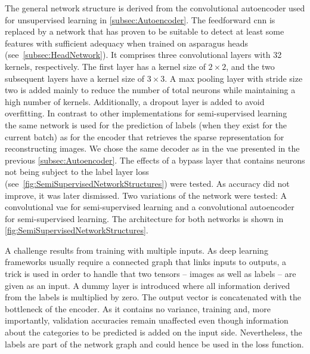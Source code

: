 \bigskip
The general network structure is derived from the convolutional autoencoder used for unsupervised learning in \autoref{subsec:Autoencoder}. The feedforward \acrshort{cnn} is replaced by a network that has proven to be suitable to detect at least some features with sufficient adequacy when trained on asparagus heads (see~\autoref{subsec:HeadNetwork}). It comprises three convolutional layers with 32 kernels, respectively. The first layer has a kernel size of $2\times2$, and the two subsequent layers have a kernel size of $3\times3$. A max pooling layer with stride size two is added mainly to reduce the number of total neurons while maintaining a high number of kernels. Additionally, a dropout layer is added to avoid overfitting. In contrast to other implementations for semi-supervised learning~\citep{keng2017semi} the same network is used for the prediction of labels (when they exist for the current batch) as for the encoder that retrieves the sparse representation for reconstructing images. We chose the same decoder as in the \acrlong{vae} presented in the previous \autoref{subsec:Autoencoder}. The effects of a bypass layer that contains neurons not being subject to the label layer loss (see~\autoref{fig:SemiSupervisedNetworkStructures}) were tested. As accuracy did not improve, it was later dismissed. Two variations of the network were tested: A convolutional \acrshort{vae} for semi-supervised learning and a convolutional autoencoder for semi-supervised learning. The architecture for both networks is shown in \autoref{fig:SemiSupervisedNetworkStructures}.

A challenge results from training with multiple inputs. As deep learning frameworks usually require a connected graph that links inputs to outputs, a trick is used in order to handle that two tensors -- images as well as labels -- are given as an input. A dummy layer is introduced where all information derived from the labels is multiplied by zero. The output vector is concatenated with the bottleneck of the encoder. As it contains no variance, training and, more importantly, validation accuracies remain unaffected even though information about the categories to be predicted is added on the input side. Nevertheless, the labels are part of the network graph and could hence be used in the loss function.

